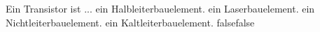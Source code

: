     {Ein Transistor ist ...}
    {ein Halbleiterbauelement.}
    {ein Laserbauelement.}
    {ein Nichtleiterbauelement.}
    {ein Kaltleiterbauelement.}
    {false}{false}